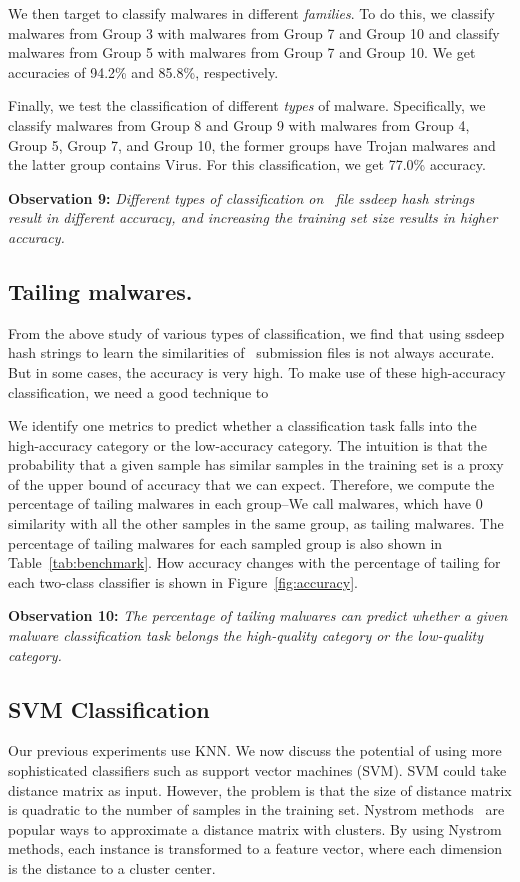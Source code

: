We then target to classify malwares in different {\em families}.
To do this, we classify malwares from Group 3 with malwares from Group 7 and Group 10
and classify malwares from Group 5 with malwares from Group 7 and Group 10. 
We get accuracies of 94.2\% and 85.8\%, respectively. 

Finally, we test the classification of different {\em types} of malware.
Specifically, we classify malwares from Group 8 and Group 9 with malwares from Group 4, Group 5, Group 7, and Group 10, 
the former groups have Trojan malwares and the latter group contains Virus. 
For this classification, we get 77.0\% accuracy. 

{\bf Observation 9:}
{\em Different types of classification on \vt\ file ssdeep hash strings result in different accuracy, and increasing the training set size results in higher accuracy.}

\subsection{Tailing malwares.}
From the above study of various types of classification,
we find that using ssdeep hash strings to learn the similarities of \vt\ submission files 
is not always accurate.
But in some cases, the accuracy is very high.
To make use of these high-accuracy classification,
we need a good technique to 

We identify one metrics to predict whether
a classification task falls into the
high-accuracy category or the low-accuracy
category. The intuition is that the probability
that a given sample has similar samples in
the training set is a proxy of the upper bound
of accuracy that we can expect. Therefore,
we compute the percentage of tailing malwares in each group--We call malwares, which have 0 similarity with all the other samples in the same group, as tailing malwares. 
The percentage of tailing malwares for each sampled group is also shown in Table~\ref{tab:benchmark}. 
How accuracy changes with the percentage of tailing for each two-class classifier is shown in Figure~\ref{fig:accuracy}. 

{\bf Observation 10:} 
{\em The percentage of tailing malwares
can predict whether a given malware classification task belongs
the high-quality category or the low-quality
category.}



\subsection{SVM Classification}
Our previous experiments use KNN.
We now discuss the potential of using
more sophisticated classifiers such as
support vector machines (SVM). 
SVM could take distance matrix as input.
However, the problem is that the size of distance matrix is quadratic to the number of samples in the training set. 
Nystrom methods~\cite{clustering-purpose} are popular ways to
approximate a distance matrix with clusters.
By using Nystrom methods, each instance is transformed to a feature vector, where each dimension is the distance to a cluster center. 

